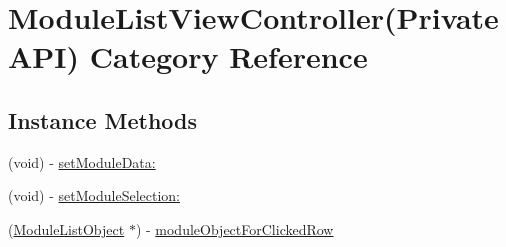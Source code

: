 \hypertarget{category_module_list_view_controller_07_private_a_p_i_08}{\section{Module\-List\-View\-Controller(Private\-A\-P\-I) Category Reference}
\label{category_module_list_view_controller_07_private_a_p_i_08}
}
\subsection*{Instance Methods}
\begin{DoxyCompactItemize}
\item 
(void) -\/ \hyperlink{category_module_list_view_controller_07_private_a_p_i_08_a438b44956d47711ac1e3a6c1edff5d6d}{set\-Module\-Data\-:}
\item 
(void) -\/ \hyperlink{category_module_list_view_controller_07_private_a_p_i_08_a70638714f3e8665a7b99dc0c85800e2e}{set\-Module\-Selection\-:}
\item 
(\hyperlink{interface_module_list_object}{Module\-List\-Object} $\ast$) -\/ \hyperlink{category_module_list_view_controller_07_private_a_p_i_08_a13228133096b0cbfa1734f16e865af84}{module\-Object\-For\-Clicked\-Row}
\end{DoxyCompactItemize}


